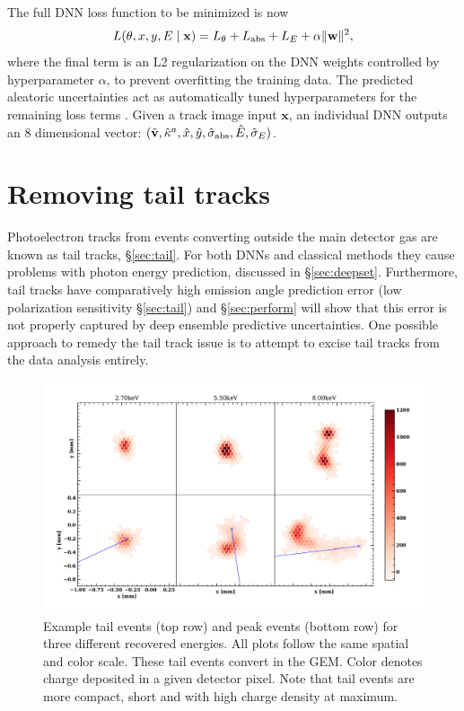 The full DNN loss function to be minimized is now
\begin{equation}
\label{eqn:fullloss}
    L(\theta, x, y, E \mid  \mathbf{x}) = L_{\theta} + L_{\rm abs} + L_{E} + \alpha \|\mathbf{w}\|^2,
\end{equation}
where the final term is an L2 regularization on the DNN weights controlled by hyperparameter $\alpha$, to prevent overfitting the training data. The predicted aleatoric uncertainties act as automatically tuned hyperparameters for the remaining loss terms \citep{kendall_multi-task_2018}. Given a track image input $\mathbf{x}$, an individual DNN outputs an 8 dimensional vector: $(\hat{\mathbf{v}}, \hat{\kappa}^a,\hat{x}, \hat{y}, \hat{\sigma}_{\rm abs}, \hat{E}, \hat{\sigma}_{E})$.



\section{Removing tail tracks}
\label{sec:removetail}
Photoelectron tracks from events converting outside the main detector gas are known as tail tracks, \S\ref{sec:tail}. For both DNNs and classical methods they cause problems with photon energy prediction, discussed in \S\ref{sec:deepset}. Furthermore, tail tracks have comparatively high emission angle prediction error (low polarization sensitivity \S\ref{sec:tail}) and \S\ref{sec:perform} will show that this error is not properly captured by deep ensemble predictive uncertainties. One possible approach to remedy the tail track issue is to attempt to excise tail tracks from the data analysis entirely.     

\begin{figure}[t]
\centering
\includegraphics[width=1.05\textwidth]{figures/fig4.pdf}
\caption{Example tail events (top row) and peak events (bottom row) for three different recovered energies. All plots follow the same spatial and color scale. These tail events convert in the GEM. Color denotes charge deposited in a given detector pixel. Note that tail events are more compact, short and with high charge density at maximum.}
\label{fig:tailvpeak}
\end{figure}

